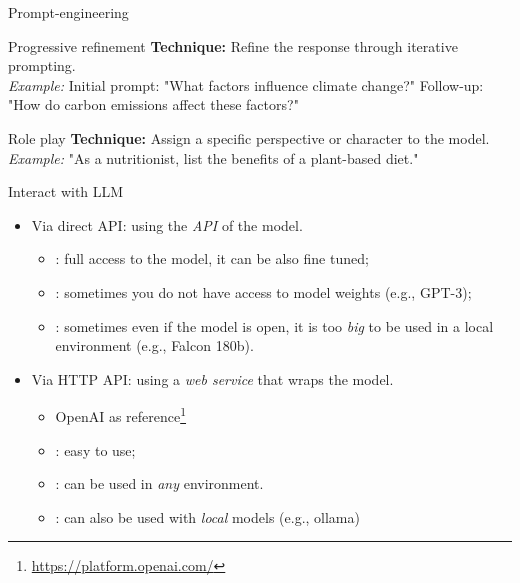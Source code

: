 \documentclass[presentation, 10pt]{beamer}\mode<presentation>{\usetheme{AMSBolognaFC}}
\begin{document}
\begin{frame}[allowframebreaks]{Prompt-engineering}
\begin{exampleblock}{Progressive refinement}
	\textbf{Technique:} Refine the response through iterative prompting. \\
	\emph{Example:} Initial prompt: "What factors influence climate change?" Follow-up: "How do carbon emissions affect these factors?"
	\end{exampleblock}
\begin{exampleblock}{Role play}
\textbf{Technique:} Assign a specific perspective or character to the model. \\
\emph{Example:} "As a nutritionist, list the benefits of a plant-based diet."
\end{exampleblock}
\end{frame}
\begin{frame}{Interact with LLM}
	\begin{itemize}
		\item Via direct API: using the \emph{API} of the model. 
		\begin{itemize}
			\item \faThumbsUp: full access to the model, it can be also fine tuned;
			\item \faThumbsDown: sometimes you do not have access to model weights (e.g., GPT-3);
			\item \faThumbsDown: sometimes even if the model is open, it is too \emph{big} to be used in a local environment (e.g., Falcon 180b).
		\end{itemize}
		\item Via HTTP API: using a \emph{web service} that wraps the model.
		\begin{itemize}
			\item OpenAI as reference\footnote{\url{https://platform.openai.com/}}
			\item \faThumbsUp: easy to use;
			\item \faThumbsUp: can be used in \emph{any} environment.
			\item \faThumbsUp: can also be used with \emph{local}
			models (e.g., ollama)
		\end{itemize}
	\end{itemize}
\end{frame}
\end{document}
